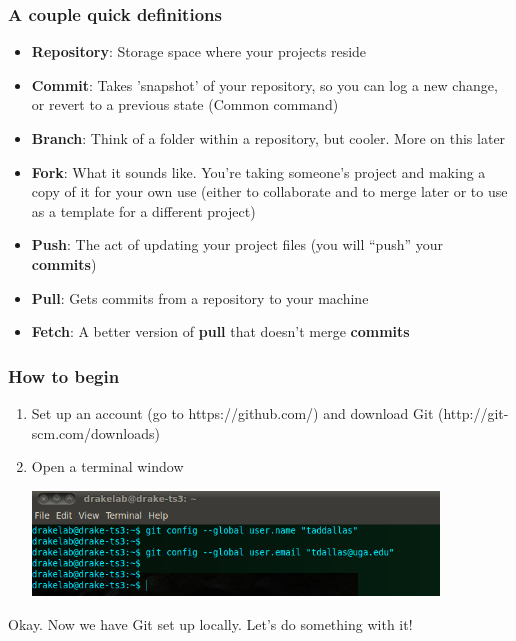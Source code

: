 \documentclass{beamer}\usepackage{graphicx, color}
\begin{document}
\begin{frame}
 \frametitle{A couple quick definitions}
  \begin{itemize}
    \item \textbf{Repository}: Storage space where your projects reside
    \item \textbf{Commit}: Takes 'snapshot' of your repository, so you can log a new change, or revert to a previous state (Common command)
    \item \textbf{Branch}: Think of a folder within a repository, but cooler. More on this later
    \item \textbf{Fork}: What it sounds like. You're taking someone's project and making a copy of it for your own use (either to collaborate and to merge later or to use as a template for a different project)
    \item \textbf{Push}: The act of updating your project files (you will ``push'' your \textbf{commits})
    \item \textbf{Pull}: Gets commits from a repository to your machine
    \item \textbf{Fetch}: A better version of \textbf{pull} that doesn't merge \textbf{commits}
  \end{itemize}
  \end{frame}








\begin{frame}
 \frametitle{How to begin}
\begin{enumerate}
 \item Set up an account (go to https://github.com/) and download Git (http://git-scm.com/downloads)
 \item Open a terminal window
\pause
\begin{center}
 \includegraphics[width=0.85\textwidth]{config.png}
\end{center}
\end{enumerate}
Okay. Now we have Git set up locally. Let's do something with it!

\end{frame}
\end{document}
